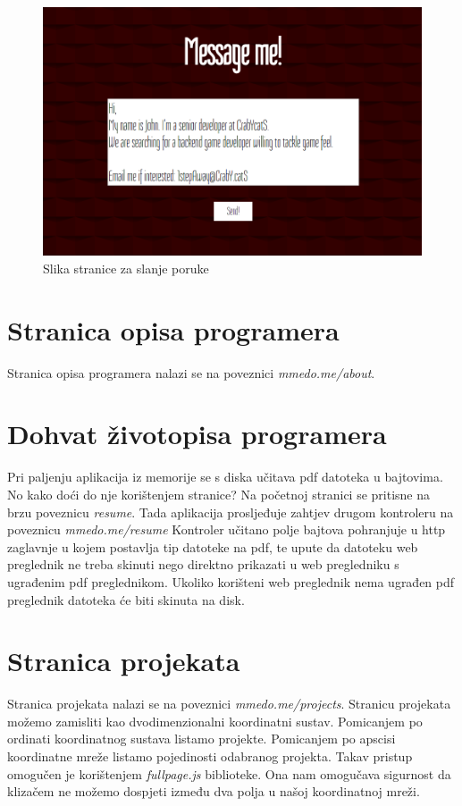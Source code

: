 \documentclass[times, utf8, zavrsni, numeric]{fer}
\begin{document}
\begin{figure}[htb]
				\centering
				\includegraphics[width=14.6cm]{images/message.png}
				\caption{Slika stranice za slanje poruke}
				\label{fig:message}
\end{figure}

\section{Stranica opisa programera}
\qquad Stranica opisa programera nalazi se na poveznici \textit{mmedo.me/about}.

\section{Dohvat životopisa programera}
\qquad Pri paljenju aplikacija iz memorije se s diska učitava pdf datoteka u bajtovima.
No kako doći do nje korištenjem stranice?
Na početnoj stranici se pritisne na brzu poveznicu \textit{resume}.
Tada aplikacija prosljeđuje zahtjev drugom kontroleru na poveznicu \textit{mmedo.me/resume} 
Kontroler učitano polje bajtova pohranjuje u http zaglavnje u kojem postavlja tip datoteke na pdf, te upute da datoteku web preglednik ne treba skinuti nego direktno prikazati u web pregledniku s ugrađenim pdf preglednikom.
Ukoliko korišteni web preglednik nema ugrađen pdf preglednik datoteka će biti skinuta na disk.

\section{Stranica projekata}
\qquad Stranica projekata nalazi se na poveznici \textit{mmedo.me/projects}.
Stranicu projekata možemo zamisliti kao dvodimenzionalni koordinatni sustav.
Pomicanjem po ordinati koordinatnog sustava listamo projekte.
Pomicanjem po apscisi koordinatne mreže listamo pojedinosti odabranog projekta.
Takav pristup omogučen je korištenjem \textit{fullpage.js} biblioteke.
Ona nam omogučava sigurnost da klizačem ne možemo dospjeti između dva polja u našoj koordinatnoj mreži.
\end{document}
